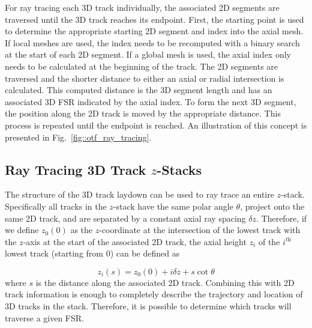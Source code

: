 For ray tracing each 3D track individually, the associated 2D segments are traversed until the 3D track reaches its endpoint. First, the starting point is used to determine the appropriate starting 2D segment and index into the axial mesh. If local meshes are used, the index needs to be recomputed with a binary search at the start of each 2D segment. If a global mesh is used, the axial index only needs to be calculated at the beginning of the track. The 2D segments are traversed and the shorter distance to either an axial or radial intersection is calculated. This computed distance is the 3D segment length and has an associated 3D FSR indicated by the axial index. To form the next 3D segment, the position along the 2D track is moved by the appropriate distance. This process is repeated until the endpoint is reached. An illustration of this concept is presented in Fig.~\ref{fig::otf_ray_tracing}.



\subsection{Ray Tracing 3D Track $z$-Stacks}

The structure of the 3D track laydown can be used to ray trace an entire $z$-stack. Specifically all tracks in the $z$-stack have the same polar angle $\theta$, project onto the same 2D track, and are separated by a constant axial ray spacing $\delta z$. Therefore, if we define $z_0(0)$ as the $z$-coordinate at the intersection of the lowest track with the $z$-axis at the start of the associated 2D track, the axial height $z_i$ of the $i^{\textit{th}}$ lowest track (starting from 0) can be defined as

\begin{equation}
z_i(s) = z_0(0) + i\delta z + s \cot{\theta}
\label{eq::track_projection}
\end{equation}
where $s$ is the distance along the associated 2D track. Combining this with 2D track information is enough to completely describe the trajectory and location of 3D tracks in the stack. Therefore, it is possible to determine which tracks will traverse a given FSR.

